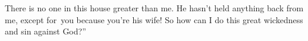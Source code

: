 
\begin{inparaenum}
   There is no one in this house greater than me. He hasn't held anything back from me, except for\understood\ you because you're his wife! So how can I do this great wickedness and sin against God?''%
\end{inparaenum}
